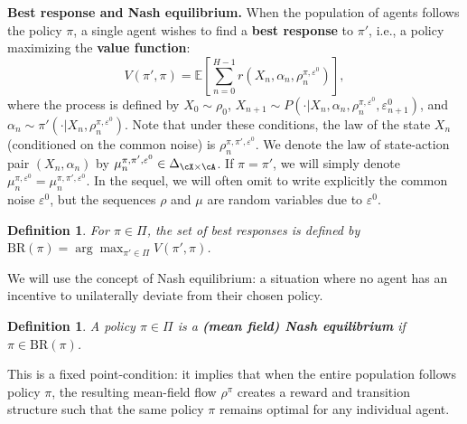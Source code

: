 \documentclass{article}
\newcommand{\defi}[1]{{\bf #1}}
\theoremstyle{plain}
\newtheorem{definition}[theorem]{Definition}
\begin{document}
\noindent\textbf{Best response and Nash equilibrium.} 
When the population of agents follows the policy $\pi$, a single agent wishes to find a \textbf{best response} to $\pi'$, i.e., a policy maximizing the \textbf{value function}:
$$
    V(\pi', \pi) = \mathbb{E} \left[ \sum_{n = 0}^{H-1} r(X_n, \alpha_n, \rho^{\pi, \varepsilon^0}_n) \right],
$$
where the process is defined by $X_0 \sim \rho_0$, $X_{n+1} \sim P(\cdot \vert X_n, \alpha_n, \rho^{\pi, \varepsilon^0}_n, \varepsilon^0_{n+1})$, and $\alpha_n \sim \pi'(\cdot \vert X_n, \rho^{\pi ,\varepsilon^0}_n)$. Note that under these conditions, the law of the state $X_n$ (conditioned on the common noise) is $\rho^{\pi, \pi', \varepsilon^0}_n$. We denote the law of state-action pair $(X_n, \alpha_n)$ by $\mu^{\pi, \pi', \varepsilon^0}_n \in \Delta_{\cX\times \cA}$.
If $\pi = \pi'$, we will simply denote $\mu^{\pi, \varepsilon^0}_n = \mu^{\pi, \pi', \varepsilon^0}_n$.  In the sequel, we will often omit to write explicitly the common noise $\varepsilon^0$, but the sequences $\rho$ and $\mu$ are random variables due to $\varepsilon^0$.


\begin{definition}
    For $\pi \in \Pi$, the set of best responses is defined by $\text{BR}(\pi) = \arg \max_{\pi' \in \Pi} V(\pi', \pi)$.
\end{definition}
We will use the concept of Nash equilibrium: a situation where no agent has an incentive to unilaterally deviate from their chosen policy.  %
\begin{definition}
    A policy $\pi \in \Pi$ is a \defi{(mean field) Nash equilibrium} if $\pi \in \text{BR}(\pi)$.
\end{definition}
This is a fixed point-condition: it implies that when the entire population follows policy $\pi$, the resulting mean-field flow $\rho^{\pi}$ creates a reward and transition structure such that the same policy $\pi$ remains optimal for any individual agent.
\end{document}
